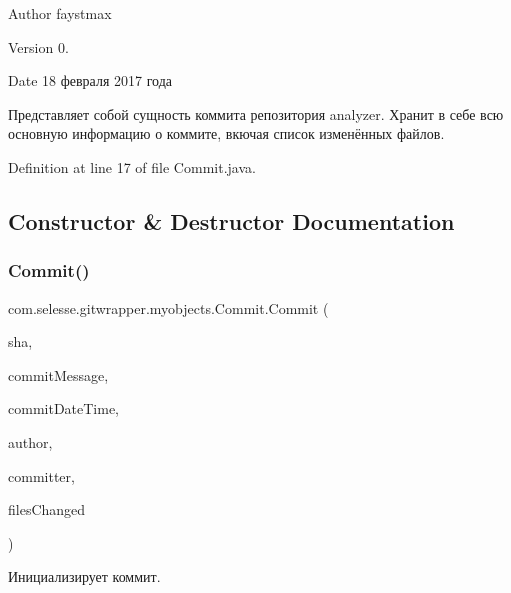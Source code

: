 \begin{DoxyAuthor}{Author}
faystmax 
\end{DoxyAuthor}
\begin{DoxyVersion}{Version}
0. 
\end{DoxyVersion}
\begin{DoxyDate}{Date}
18 февраля 2017 года 
\end{DoxyDate}
Представляет собой сущность коммита репозитория analyzer. Хранит в себе всю основную информацию о коммите, вкючая список изменённых файлов. 

Definition at line 17 of file Commit.\+java.



\subsection{Constructor \& Destructor Documentation}
\mbox{\label{classcom_1_1selesse_1_1gitwrapper_1_1myobjects_1_1_commit_ac72033557306edc2a95f19e5cd6b4d8b}} 
\subsubsection{\texorpdfstring{Commit()}{Commit()}}
{\footnotesize\ttfamily com.\+selesse.\+gitwrapper.\+myobjects.\+Commit.\+Commit (\begin{DoxyParamCaption}\item[{String}]{sha,  }\item[{String}]{commit\+Message,  }\item[{Zoned\+Date\+Time}]{commit\+Date\+Time,  }\item[{\hyperlink{classcom_1_1selesse_1_1gitwrapper_1_1myobjects_1_1_author}{Author}}]{author,  }\item[{\hyperlink{classcom_1_1selesse_1_1gitwrapper_1_1myobjects_1_1_author}{Author}}]{committer,  }\item[{List$<$ \hyperlink{classcom_1_1selesse_1_1gitwrapper_1_1myobjects_1_1_git_file}{Git\+File} $>$}]{files\+Changed }\end{DoxyParamCaption})}

Инициализирует коммит.


